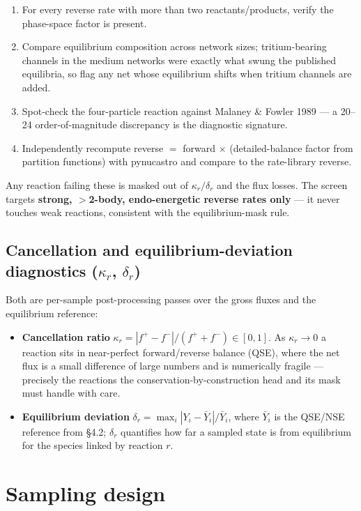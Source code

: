 \documentclass[11pt]{article}
\begin{document}
\begin{enumerate}
\item For every reverse rate with more than two reactants/products, verify the phase-space factor is present.
\item Compare equilibrium composition across network sizes; tritium-bearing channels in the medium networks were exactly what swung the published equilibria, so flag any net whose equilibrium shifts when tritium channels are added.
\item Spot-check the four-particle reaction against Malaney \& Fowler 1989 --- a 20--24 order-of-magnitude discrepancy is the diagnostic signature.
\item Independently recompute reverse $=$ forward $\times$ (detailed-balance factor from partition functions) with pynucastro and compare to the rate-library reverse.
\end{enumerate}

Any reaction failing these is masked out of $\kappa_r/\delta_r$ and the flux losses. The screen targets \textbf{strong, $>$2-body, endo-energetic reverse rates only} --- it never touches weak reactions, consistent with the equilibrium-mask rule.

\subsection{Cancellation and equilibrium-deviation diagnostics (\texorpdfstring{$\kappa_r$, $\delta_r$}{kappa, delta})}

Both are per-sample post-processing passes over the gross fluxes and the equilibrium reference:

\begin{itemize}
\item \textbf{Cancellation ratio} $\kappa_r = |f^+ - f^-| / (f^+ + f^-) \in [0,1]$. As $\kappa_r \to 0$ a reaction sits in near-perfect forward/reverse balance (QSE), where the net flux is a small difference of large numbers and is numerically fragile --- precisely the reactions the conservation-by-construction head and its mask must handle with care.
\item \textbf{Equilibrium deviation} $\delta_r = \max_i |Y_i - \bar{Y}_i| / \bar{Y}_i$, where $\bar{Y}_i$ is the QSE/NSE reference from \S4.2; $\delta_r$ quantifies how far a sampled state is from equilibrium for the species linked by reaction $r$.
\end{itemize}

\section{Sampling design}
\end{document}
